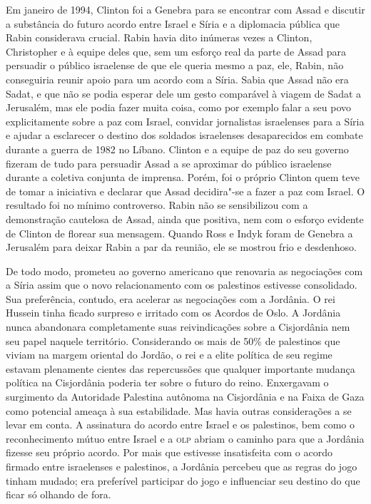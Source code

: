 Em janeiro de 1994, Clinton foi a Genebra para se encontrar com Assad e
discutir a substância do futuro acordo entre Israel e Síria e a
diplomacia pública que Rabin considerava crucial. Rabin havia dito
inúmeras vezes a Clinton, Christopher e à equipe deles que, sem um
esforço real da parte de Assad para persuadir o público israelense de que
ele queria mesmo a paz, ele, Rabin, não conseguiria reunir apoio para um
acordo com a Síria. Sabia que Assad não era Sadat, e que não se podia
esperar dele um gesto comparável à viagem de Sadat a Jerusalém, mas ele
podia fazer muita coisa, como por exemplo falar a seu povo
explicitamente sobre a paz com Israel, convidar jornalistas israelenses
para a Síria e ajudar a esclarecer o destino dos soldados israelenses
desaparecidos em combate durante a guerra de 1982 no Líbano. Clinton e a
equipe de paz do seu governo fizeram de tudo para persuadir Assad a se aproximar
do público israelense durante a coletiva conjunta de imprensa. Porém,
foi o próprio Clinton quem teve de tomar a iniciativa e declarar que Assad
decidira"-se a fazer a paz com Israel. O resultado foi no mínimo
controverso. Rabin não se sensibilizou com a demonstração cautelosa de
Assad, ainda que positiva, nem com o esforço evidente de Clinton de
florear sua mensagem. Quando Ross e Indyk foram de Genebra a Jerusalém
para deixar Rabin a par da reunião, ele se mostrou frio e desdenhoso.

De todo modo, prometeu ao governo americano que renovaria as negociações
com a Síria assim que o novo relacionamento com os palestinos estivesse
consolidado. Sua preferência, contudo, era acelerar as negociações com a
Jordânia. O rei Hussein tinha ficado surpreso e irritado com os Acordos
de Oslo. A Jordânia nunca abandonara completamente suas reivindicações
sobre a Cisjordânia nem seu papel naquele território. Considerando os
mais de 50\% de palestinos que viviam na margem oriental
do Jordão, o rei e a elite política de seu regime estavam plenamente
cientes das repercussões que qualquer importante mudança política na
Cisjordânia poderia ter sobre o futuro do reino. Enxergavam o surgimento
da Autoridade Palestina autônoma na Cisjordânia e na Faixa de Gaza como
potencial ameaça à sua estabilidade. Mas havia outras considerações a se
levar em conta. A assinatura do acordo entre Israel e os palestinos, bem como o
reconhecimento mútuo entre Israel e a \textsc{olp} abriam o caminho para que a
Jordânia fizesse seu próprio acordo. Por mais que estivesse insatisfeita
com o acordo firmado entre israelenses e palestinos, a Jordânia percebeu
que as regras do jogo tinham mudado; era preferível participar do jogo e
influenciar seu destino do que ficar só olhando de fora.

